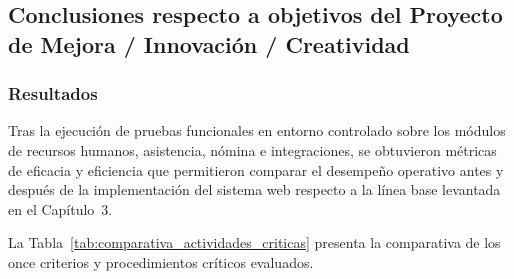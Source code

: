 \subsection{Conclusiones respecto a objetivos del Proyecto de Mejora / Innovación / Creatividad}

\subsubsection{Resultados}
Tras la ejecución de pruebas funcionales en entorno controlado sobre los módulos de recursos humanos, 
asistencia, nómina e integraciones, se obtuvieron métricas de eficacia y eficiencia que permitieron comparar el desempeño operativo antes y 
después de la implementación del sistema web respecto a la línea base levantada en el Capítulo~3.

La Tabla~\ref{tab:comparativa_actividades_criticas} presenta la comparativa de los once criterios y procedimientos críticos evaluados.

